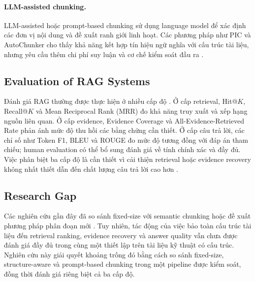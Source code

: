 \paragraph{LLM-assisted chunking.}
LLM-assisted hoặc prompt-based chunking sử dụng language model để xác định các đơn vị nội dung và đề xuất ranh giới linh hoạt. Các phương pháp như PIC và AutoChunker cho thấy khả năng kết hợp tín hiệu ngữ nghĩa với cấu trúc tài liệu, nhưng yêu cầu thêm chi phí suy luận và cơ chế kiểm soát đầu ra \citep{wang-etal-2025-document,jain-etal-2025-autochunker}.

\subsection{Evaluation of RAG Systems}

Đánh giá RAG thường được thực hiện ở nhiều cấp độ \citep{yu-etal-2024-rag-evaluation}. Ở cấp retrieval, Hit@\(K\), Recall@\(K\) và Mean Reciprocal Rank (MRR) đo khả năng truy xuất và xếp hạng nguồn liên quan. Ở cấp evidence, Evidence Coverage và All-Evidence-Retrieved Rate phản ánh mức độ thu hồi các bằng chứng cần thiết. Ở cấp câu trả lời, các chỉ số như Token F1, BLEU và ROUGE đo mức độ tương đồng với đáp án tham chiếu; human evaluation có thể bổ sung đánh giá về tính chính xác và đầy đủ. Việc phân biệt ba cấp độ là cần thiết vì cải thiện retrieval hoặc evidence recovery không nhất thiết dẫn đến chất lượng câu trả lời cao hơn \citep{qu-etal-2025-semantic}.

\subsection{Research Gap}

Các nghiên cứu gần đây đã so sánh fixed-size với semantic chunking hoặc đề xuất phương pháp phân đoạn mới \citep{qu-etal-2025-semantic,wang-etal-2025-document}. Tuy nhiên, tác động của việc bảo toàn cấu trúc tài liệu đến retrieval ranking, evidence recovery và answer quality vẫn chưa được đánh giá đầy đủ trong cùng một thiết lập trên tài liệu kỹ thuật có cấu trúc. Nghiên cứu này giải quyết khoảng trống đó bằng cách so sánh fixed-size, structure-aware và prompt-based chunking trong một pipeline được kiểm soát, đồng thời đánh giá riêng biệt cả ba cấp độ.